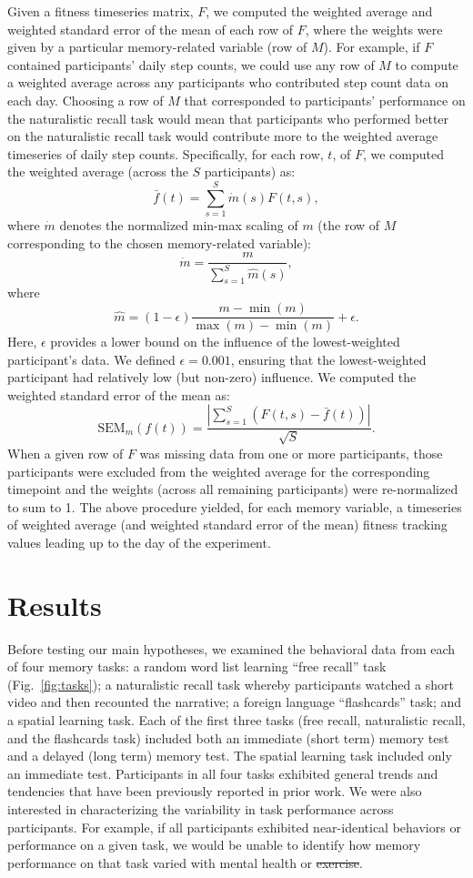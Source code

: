 \documentclass[10pt]{article}
\providecommand{\DIFaddtex}[1]{{\protect\color{blue}\uwave{#1}}} %
\providecommand{\DIFdeltex}[1]{{\protect\color{red}\sout{#1}}}                      %
\providecommand{\DIFaddbegin}{} %
\providecommand{\DIFaddend}{} %
\providecommand{\DIFdelbegin}{} %
\providecommand{\DIFdelend}{} %
\providecommand{\DIFadd}[1]{\texorpdfstring{\DIFaddtex{#1}}{#1}} %
\providecommand{\DIFdel}[1]{\texorpdfstring{\DIFdeltex{#1}}{}} %
\newcommand{\DIFscaledelfig}{0.5}
\newlength{\DIFdelgraphicswidth} %
\newlength{\DIFdelgraphicsheight} %
\newcommand{\DIFaddincludegraphics}[2][]{{\color{blue}\fbox{\DIFOincludegraphics[#1]{#2}}}} %
\newcommand{\DIFdelincludegraphics}[2][]{%
\sbox{\DIFdelgraphicsbox}{\DIFOincludegraphics[#1]{#2}}%
\settoboxwidth{\DIFdelgraphicswidth}{\DIFdelgraphicsbox} %
\settoboxtotalheight{\DIFdelgraphicsheight}{\DIFdelgraphicsbox} %
\scalebox{\DIFscaledelfig}{%
\parbox[b]{\DIFdelgraphicswidth}{\usebox{\DIFdelgraphicsbox}\\[-\baselineskip] \rule{\DIFdelgraphicswidth}{0em}}\llap{\resizebox{\DIFdelgraphicswidth}{\DIFdelgraphicsheight}{%
\setlength{\unitlength}{\DIFdelgraphicswidth}%
\begin{picture}(1,1)%
\thicklines\linethickness{2pt} %
{\color[rgb]{1,0,0}\put(0,0){\framebox(1,1){}}}%
{\color[rgb]{1,0,0}\put(0,0){\line( 1,1){1}}}%
{\color[rgb]{1,0,0}\put(0,1){\line(1,-1){1}}}%
\end{picture}%
}\hspace*{3pt}}} %
} %
\DeclareRobustCommand{\DIFaddbegin}{\DIFOaddbegin \let\includegraphics\DIFaddincludegraphics} %
\DeclareRobustCommand{\DIFaddend}{\DIFOaddend \let\includegraphics\DIFOincludegraphics} %
\DeclareRobustCommand{\DIFdelbegin}{\DIFOdelbegin \let\includegraphics\DIFdelincludegraphics} %
\DeclareRobustCommand{\DIFdelend}{\DIFOaddend \let\includegraphics\DIFOincludegraphics} %
\begin{document}
Given a fitness timeseries matrix, $F$, we computed the weighted
average and weighted standard error of the mean of each row of $F$,
where the weights were given by a particular memory-related variable
(row of $M$).  For example, if $F$ contained participants' daily step
counts, we could use any row of $M$ to compute a weighted average
across any participants who contributed step count data on each day.
Choosing a row of $M$ that corresponded to participants' performance
on the naturalistic recall task would mean that participants who
performed better on the naturalistic recall task would contribute more
to the weighted average timeseries of daily step counts.
Specifically, for each row, $t$, of $F$, we computed the weighted
average (across the $S$ participants) as:
\[
\bar{f}(t) = \sum_{s=1}^S \dot{m}(s) F(t, s),
\]
where $\dot{m}$ denotes the normalized min-max scaling of $m$ (the row
of $M$ corresponding to the chosen memory-related variable):
\[
  \dot{m} = \frac{m}{\sum_{s=1}^S \hat{m}(s)},
\]
where
\[
  \hat{m} = (1 - \epsilon)\frac{m - \min(m)}{\max(m) - \min(m)} + \epsilon.
\]
Here, $\epsilon$ provides a lower bound on the influence of the
lowest-weighted participant's data.  We defined $\epsilon = 0.001$,
ensuring that the lowest-weighted participant had relatively low (but
non-zero) influence.  We computed the weighted standard error of the
mean as:
\[
\mathrm{SEM}_m\left(f(t)\right) = \frac{\left| \sum_{s=1}^S \left( F(t, s) -
    \bar{f}(t)\right) \right|}{\sqrt{S}}.
\]
When a given row of $F$ was missing data from one or more
participants, those participants were excluded from the weighted
average for the corresponding timepoint and the weights (across all
remaining participants) were re-normalized to sum to 1.  The above
procedure yielded, for each memory variable, a timeseries of weighted
average (and weighted standard error of the mean) fitness tracking
values leading up to the day of the experiment.

\section*{Results}
Before testing our main hypotheses, we examined the behavioral data
from each of four memory tasks: a random word list learning ``free
recall'' task (Fig.~\ref{fig:tasks}); a naturalistic recall task whereby participants watched
a short video and then recounted the narrative; a foreign language
``flashcards'' task; and a spatial learning task.  Each of the first
three tasks (free recall, naturalistic recall, and the flashcards
task) included both an immediate (short term) memory test and a
delayed (long term) memory test.  The spatial learning task included
only an immediate test. Participants in all four tasks exhibited
general trends and tendencies that have been previously reported in
prior work.  We were also interested in characterizing the variability
in task performance across participants.  For example, if all
participants exhibited near-identical behaviors or performance on a
given task, we would be unable to identify how memory performance on
that task varied with mental health or \DIFdelbegin \DIFdel{exercise}\DIFdelend \DIFaddbegin \DIFadd{physical activity}\DIFaddend .
\end{document}
